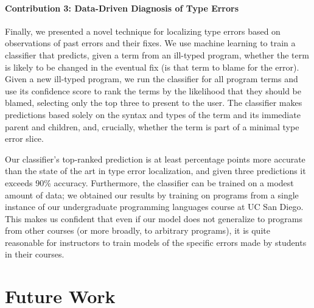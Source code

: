 \paragraph{Contribution 3: Data-Driven Diagnosis of Type Errors}
Finally, we presented a novel technique for localizing type errors based
on observations of past errors and their fixes.
%
We use machine learning to train a classifier that predicts, given a
term from an ill-typed program, whether the term is likely to be changed
in the eventual fix (\ie is that term to blame for the error).
%
Given a new ill-typed program, we run the classifier for all program
terms and use its confidence score to rank the terms by the likelihood
that they should be blamed, selecting only the top three to present to
the user.
%
The classifier makes predictions based solely on the syntax and types of
the term and its immediate parent and children, and, crucially, whether
the term is part of a minimal type error slice.

Our classifier's top-ranked prediction is at least \ToolnameWinSherrloc
percentage points more accurate than the state of the art in type error
localization, and given three predictions it exceeds 90\% accuracy.
%
Furthermore, the classifier can be trained on a modest amount of data;
we obtained our results by training on programs from a single instance
of our undergraduate programming languages course at UC San Diego.
%
This makes us confident that even if our model does not generalize to
programs from other courses (or more broadly, to arbitrary \ocaml
programs), it is quite reasonable for instructors to train models of the
specific errors made by students in their courses.


\section{Future Work}
\label{sec:conc:future-work}
